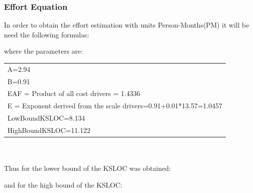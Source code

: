 \documentclass[a4paper]{article}
\begin{document}
\subsubsection{Effort Equation}
In order to obtain the effort estimation with units Person-Months(PM) it will be need the following formulas:

\begin{figure}[h]
\vspace*{\fill}
\noindent{}%
\vspace*{0cm}
\end{figure}
\begin{figure}[h]
\vspace*{\fill}
\noindent{}%
\vspace*{0cm}
\end{figure}

where the parameters are:\\
\begin{tabular}{ | l| }
\hline
A=2.94\\
B=0.91\\
EAF = Product of all cost drivers = 1.4336\\
E = Exponent derived from the scale drivers=0.91+0.01*13.57=1.0457\\
LowBoundKSLOC=8.134\\
HighBoundKSLOC=11.122\\
\hline
\end{tabular}\\\\
 Thus for the lower bound of the KSLOC was obtained:
 \begin{figure}[h]
\noindent{}%
\end{figure}
and for the high bound of the KSLOC:
\begin{figure}[!h]
\noindent{}%
\end{figure}
\end{document}
